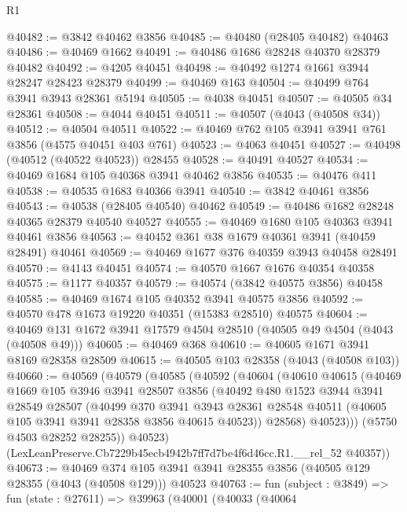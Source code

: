 \begin{lexlean}{R1}
\begin{coremodule}
@40482 := @3842 @40462 @3856
@40485 := @40480 (@28405 @40482) @40463
@40486 := @40469 @1662
@40491 := @40486 @1686 @28248 @40370 @28379 @40482
@40492 := @4205 @40451
@40498 := @40492 @1274 @1661 @3944 @28247 @28423 @28379
@40499 := @40469 @163
@40504 := @40499 @764 @3941 @3943 @28361 @5194
@40505 := @4038 @40451
@40507 := @40505 @34 @28361
@40508 := @4044 @40451
@40511 := @40507 (@4043 (@40508 @34))
@40512 := @40504 @40511
@40522 := @40469 @762 @105 @3941 @3941 @761 @3856 (@4575 @40451 @403 @761)
@40523 := @4063 @40451
@40527 := @40498 (@40512 (@40522 @40523)) @28455
@40528 := @40491 @40527
@40534 := @40469 @1684 @105 @40368 @3941 @40462 @3856
@40535 := @40476 @411
@40538 := @40535 @1683 @40366 @3941
@40540 := @3842 @40461 @3856
@40543 := @40538 (@28405 @40540) @40462
@40549 := @40486 @1682 @28248 @40365 @28379 @40540 @40527
@40555 := @40469 @1680 @105 @40363 @3941 @40461 @3856
@40563 := @40452 @361 @38 @1679 @40361 @3941 (@40459 @28491) @40461
@40569 := @40469 @1677 @376 @40359 @3943 @40458 @28491
@40570 := @4143 @40451
@40574 := @40570 @1667 @1676 @40354 @40358
@40575 := @1177 @40357
@40579 := @40574 (@3842 @40575 @3856) @40458
@40585 := @40469 @1674 @105 @40352 @3941 @40575 @3856
@40592 := @40570 @478 @1673 @19220 @40351 (@15383 @28510) @40575
@40604 := @40469 @131 @1672 @3941 @17579 @4504 @28510 (@40505 @49 @4504 (@4043 (@40508 @49)))
@40605 := @40469 @368
@40610 := @40605 @1671 @3941 @8169 @28358 @28509
@40615 := @40505 @103 @28358 (@4043 (@40508 @103))
@40660 := @40569
    (@40579
      (@40585
        (@40592
          (@40604
            (@40610
              @40615
              (@40469
                @1669
                @105
                @3946
                @3941
                @28507
                @3856
                (@40492
                  @480
                  @1523
                  @3944
                  @3941
                  @28549
                  @28507
                  (@40499
                    @370
                    @3941
                    @3943
                    @28361
                    @28548
                    @40511
                    (@40605 @105 @3941 @3941 @28358 @3856 @40615 @40523))
                  @28568)
                @40523)))
          (@5750 @4503 @28252 @28255))
        @40523)
      (LexLeanPreserve.Cb7229b45ecb4942b7ff7d7be4f6d46cc.R1.__rel_52 @40357))
@40673 := @40469
    @374
    @105
    @3941
    @3941
    @28355
    @3856
    (@40505 @129 @28355 (@4043 (@40508 @129)))
    @40523
@40763 := fun (subject : @3849) =>
  fun (state : @27611) =>
  @39963
    (@40001
      (@40033
        (@40064

\end{coremodule}
\end{lexlean}
